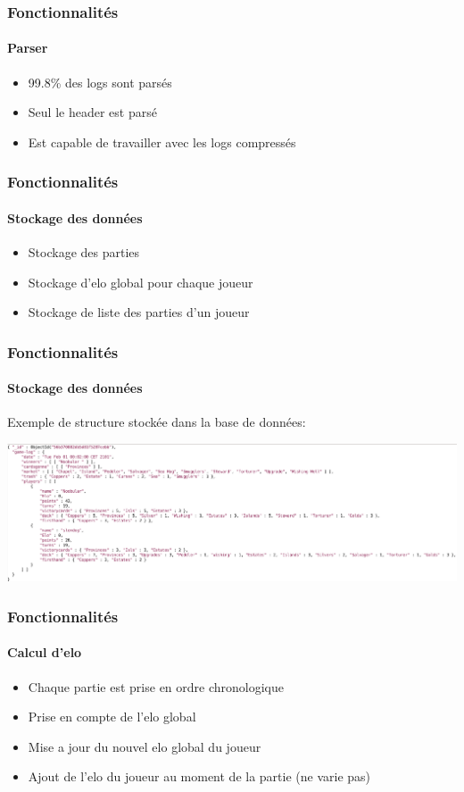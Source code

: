 \documentclass{beamer}
\begin{document}
\begin{frame}
  \frametitle{Fonctionnalités}
  \framesubtitle{Parser}
  \begin{itemize}
  \item 99.8\% des logs sont parsés
  \item Seul le header est parsé
  \item Est capable de travailler avec les logs compressés
  \end{itemize}
\end{frame}

\begin{frame}
  \frametitle{Fonctionnalités}
  \framesubtitle{Stockage des données}
  \begin{itemize}
  \item Stockage des parties
  \item Stockage d'elo global pour chaque joueur
  \item Stockage de liste des parties d'un joueur
  \end{itemize}
\end{frame}

\begin{frame}
  \frametitle{Fonctionnalités}
  \framesubtitle{Stockage des données}
  Exemple de structure stockée dans la base de données:\newline
  \begin{center}
    \includegraphics[scale=0.21,keepaspectratio]{code}
  \end{center}
\end{frame}

\begin{frame}
  \frametitle{Fonctionnalités}
  \framesubtitle{Calcul d'elo}
  \begin{itemize}
  \item Chaque partie est prise en ordre chronologique
  \item Prise en compte de l'elo global
  \item Mise a jour du nouvel elo global du joueur
  \item Ajout de l'elo du joueur au moment de la partie (ne varie pas)
  \end{itemize}
\end{frame}
\end{document}
